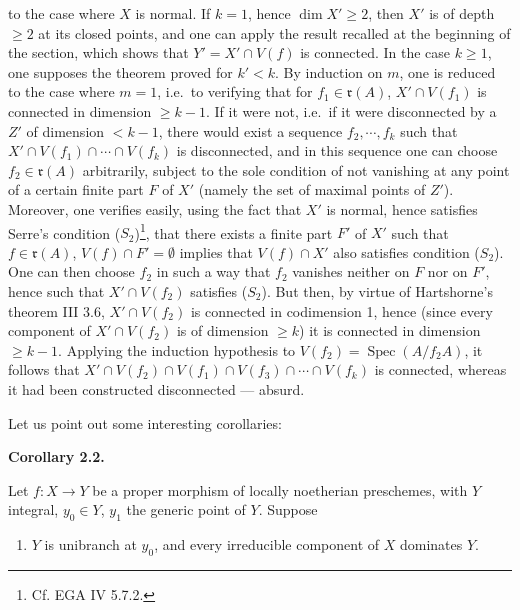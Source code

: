 \documentclass[
]{article}
\providecommand{\tightlist}{%
  \setlength{\itemsep}{0pt}\setlength{\parskip}{0pt}}
\begin{document}
to the case where \(X\) is normal. If \(k = 1\), hence
\(\dim X' \geqslant 2\), then \(X'\) is of depth \(\geqslant 2\) at its
closed points, and one can apply the result recalled at the beginning of
the section, which shows that \(Y' = X' \cap V(f)\) is connected. In the
case \(k \geqslant 1\), one supposes the theorem proved for \(k' < k\).
By induction on \(m\), one is reduced to the case where \(m = 1\),
i.e.~to verifying that for \(f_{1} \in \mathfrak{r}(A)\),
\(X' \cap V(f_{1})\) is connected in dimension \(\geqslant k - 1\). If
it were not, i.e.~if it were disconnected by a \(Z'\) of dimension
\(< k - 1\), there would exist a sequence \(f_{2}, \cdots, f_{k}\) such
that \(X' \cap V(f_{1}) \cap \cdots \cap V(f_{k})\) is disconnected, and
in this sequence one can choose \(f_{2} \in \mathfrak{r}(A)\)
arbitrarily, subject to the sole condition of not vanishing at any point
of a certain finite part \(F\) of \(X'\) (namely the set of maximal
points of \(Z'\)). Moreover, one verifies easily, using the fact that
\(X'\) is normal, hence satisfies Serre's condition
(\(S_{2}\))\footnote{Cf. EGA IV 5.7.2.}, that there exists a finite part
\(F'\) of \(X'\) such that \(f \in \mathfrak{r}(A)\),
\(V(f) \cap F' = \emptyset\) implies that \(V(f) \cap X'\) also
satisfies condition (\(S_{2}\)). One can then choose \(f_{2}\) in such a
way that \(f_{2}\) vanishes neither on \(F\) nor on \(F'\), hence such
that \(X' \cap V(f_{2})\) satisfies (\(S_{2}\)). But then, by virtue of
Hartshorne's theorem III 3.6, \(X' \cap V(f_{2})\) is connected in
codimension 1, hence (since every component of \(X' \cap V(f_{2})\) is
of dimension \(\geqslant k\)) it is connected in dimension
\(\geqslant k - 1\). Applying the induction hypothesis to
\(V(f_{2}) = \operatorname{Spec}(A/f_{2}A)\), it follows that
\(X' \cap V(f_{2}) \cap V(f_{1}) \cap V(f_{3}) \cap \cdots \cap V(f_{k})\)
is connected, whereas it had been constructed disconnected --- absurd.

Let us point out some interesting corollaries:

\textbf{Corollary 2.2.}

Let \(f : X \to Y\) be a proper morphism of locally noetherian
preschemes, with \(Y\) integral, \(y_{0} \in Y\), \(y_{1}\) the generic
point of \(Y\). Suppose

\begin{enumerate}
\def\labelenumi{\alph{enumi})}
\tightlist
\item
  \(Y\) is unibranch at \(y_{0}\), and every irreducible component of
  \(X\) dominates \(Y\).
\end{enumerate}
\end{document}
